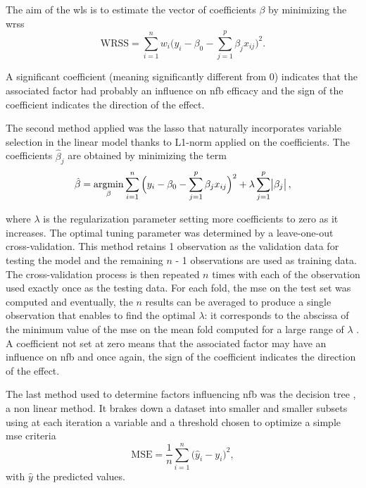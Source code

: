 \documentclass[12pt,a4paper,english]{article}
\DeclareMathOperator*{\argmin}{argmin}
\begin{document}
\noindent The aim of the \gls{wls} is to estimate the vector of coefficients $\beta$ by minimizing the \gls{wrss}
\begin{equation}
\label{eq:factors_WRSS}
\text{WRSS} = \sum_{i=1}^{n} w_i \Big(y_i - \beta_{0} - \sum_{j=1}^{p}\beta_{j}x_{ij}\Big)^2.
\end{equation}

A significant coefficient (meaning significantly different from 0) indicates that the associated factor had probably an 
influence on \gls{nfb} efficacy and the sign of the coefficient indicates the direction of the effect.

The second method applied was the \gls{lasso} that naturally incorporates variable selection 
in the linear model thanks to L1-norm applied on the coefficients. The coefficients $\hat{\beta}_j$ are obtained by minimizing the term
\begin{equation}
\label{eq:factors_lasso-minimization}
\hat{\beta} = \argmin_\beta \sum_{i=1}^{n} \Big(y_i - \beta_{0} - \sum_{j=1}^{p}\beta_{j}x_{ij}\Big)^2 + \lambda \sum_{j=1}^{p}\abs{\beta_{j}},
\end{equation} 

\noindent where $\lambda$ is the regularization parameter setting more coefficients to zero as it increases. The optimal tuning parameter was determined 
by a leave-one-out cross-validation. This method retains 1 observation as the validation data for testing the model and the 
remaining $n$ - 1 observations are used as training data. The cross-validation process is then repeated $n$ times with each of the observation 
used exactly once as the testing data. For each fold, the \gls{mse} on the test set was computed and eventually, the $n$ results can 
be averaged to produce a single observation that enables to find the optimal $\lambda$: it corresponds to the abscissa of the minimum
value of the \gls{mse} on the mean fold computed for a large range of $\lambda$ \citep{James2013}. 
A coefficient not set at zero means that the associated factor may have an influence on \gls{nfb} and once again,
the sign of the coefficient indicates the direction of the effect.

The last method used to determine factors influencing \gls{nfb} was the decision tree \citep{Quinlan1986}, a non linear method. 
It brakes down a dataset into smaller and smaller subsets using at each iteration a variable and a threshold chosen to optimize a simple 
\gls{mse} criteria 
\begin{equation}
\label{eq:factors_decision_tree_mse}
\text{MSE} = \frac{1}{n}\sum_{i=1}^{n} \Big(\hat{y}_i - {y}_i\Big)^2,
\end{equation}
\noindent with $\hat{y}$ the predicted values.
\end{document}
